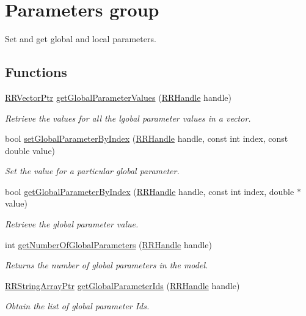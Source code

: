 \hypertarget{group__parameters}{\section{Parameters group}
\label{group__parameters}
}


Set and get global and local parameters.  


\subsection*{Functions}
\begin{DoxyCompactItemize}
\item 
\hyperlink{rrc__types_8h_a3be72d6006034fd349f753d2bf441bf7}{R\-R\-Vector\-Ptr} \hyperlink{group__parameters_ga3add5376f5242d85532074605e19f38c}{get\-Global\-Parameter\-Values} (\hyperlink{rrc__types_8h_a1d68f0592372208fa5a5f2799ea4b3ae}{R\-R\-Handle} handle)
\begin{DoxyCompactList}\small\item\em Retrieve the values for all the lgobal parameter values in a vector. \end{DoxyCompactList}\item 
bool \hyperlink{group__parameters_gaf53b31742420ec60079ca65c62a65801}{set\-Global\-Parameter\-By\-Index} (\hyperlink{rrc__types_8h_a1d68f0592372208fa5a5f2799ea4b3ae}{R\-R\-Handle} handle, const int index, const double value)
\begin{DoxyCompactList}\small\item\em Set the value for a particular global parameter. \end{DoxyCompactList}\item 
bool \hyperlink{group__parameters_ga87c8b1dbb74786c677502d34ecfd19ba}{get\-Global\-Parameter\-By\-Index} (\hyperlink{rrc__types_8h_a1d68f0592372208fa5a5f2799ea4b3ae}{R\-R\-Handle} handle, const int index, double $\ast$value)
\begin{DoxyCompactList}\small\item\em Retrieve the global parameter value. \end{DoxyCompactList}\item 
int \hyperlink{group__parameters_ga3c5874112e8cd770fdeff634261b1740}{get\-Number\-Of\-Global\-Parameters} (\hyperlink{rrc__types_8h_a1d68f0592372208fa5a5f2799ea4b3ae}{R\-R\-Handle} handle)
\begin{DoxyCompactList}\small\item\em Returns the number of global parameters in the model. \end{DoxyCompactList}\item 
\hyperlink{rrc__types_8h_a7c9475df6c7337d99482b13a365e7596}{R\-R\-String\-Array\-Ptr} \hyperlink{group__parameters_ga75b8b7b950a89fce030cbc0120051e90}{get\-Global\-Parameter\-Ids} (\hyperlink{rrc__types_8h_a1d68f0592372208fa5a5f2799ea4b3ae}{R\-R\-Handle} handle)
\begin{DoxyCompactList}\small\item\em Obtain the list of global parameter Ids. \end{DoxyCompactList}\end{DoxyCompactItemize}


